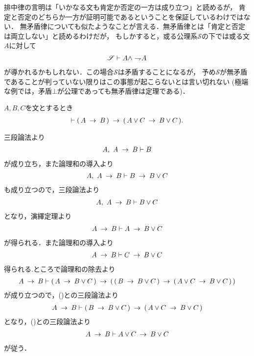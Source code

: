 	排中律の言明は「いかなる文も肯定か否定の一方は成り立つ」と読めるが，
	肯定と否定のどちらか一方が証明可能であるということを保証しているわけではない．
	無矛盾律についても似たようなことが言える．無矛盾律とは「肯定と否定は両立しない」と読めるわけだが，
	もしかすると，或る公理系$\mathscr{S}$の下では或る文$A$に対して
	\begin{align}
		\mathscr{S} \vdash A \wedge \rightharpoondown\hspace{-0.25em} A
	\end{align}
	が導かれるかもしれない．この場合$\mathscr{S}$は矛盾することになるが，
	予め$\mathscr{S}$が無矛盾であることが判っていない限りはこの事態が起こらないとは言い切れない
	(極端な例では，矛盾$\bot$が公理であっても無矛盾律は定理である)．
	
	\begin{screen}
		\begin{logicalthm}[含意の論理和への遺伝性]
		\label{logicalthm:heredity_of_implication_to_disjunction}
			$A,B,C$を文とするとき
			\begin{align}
				\vdash (\, A \hspace{0.25em}\rightarrow\hspace{0.25em} B\, ) \hspace{0.25em}\rightarrow\hspace{0.25em} (\, A \vee C \hspace{0.25em}\rightarrow\hspace{0.25em} B \vee C\, ).
			\end{align}
		\end{logicalthm}
	\end{screen}
	
	\begin{sketch}
		三段論法より
		\begin{align}
			A,\ A \hspace{0.25em}\rightarrow\hspace{0.25em} B \vdash B
		\end{align}
		が成り立ち，また論理和の導入より
		\begin{align}
			A,\ A \hspace{0.25em}\rightarrow\hspace{0.25em} B \vdash B \hspace{0.25em}\rightarrow\hspace{0.25em} B \vee C
		\end{align}
		も成り立つので，三段論法より
		\begin{align}
			A,\ A \hspace{0.25em}\rightarrow\hspace{0.25em} B \vdash B \vee C
		\end{align}
		となり，演繹定理より
		\begin{align}
			A \hspace{0.25em}\rightarrow\hspace{0.25em} B \vdash A \hspace{0.25em}\rightarrow\hspace{0.25em} B \vee C
			\label{fom:heredity_of_implication_to_disjunction_1}
		\end{align}
		が得られる．また論理和の導入より
		\begin{align}
			A \hspace{0.25em}\rightarrow\hspace{0.25em} B \vdash C \hspace{0.25em}\rightarrow\hspace{0.25em} B \vee C
			\label{fom:heredity_of_implication_to_disjunction_2}
		\end{align}
		得られる.ところで論理和の除去より
		\begin{align}
			A \hspace{0.25em}\rightarrow\hspace{0.25em} B \vdash (\, A \hspace{0.25em}\rightarrow\hspace{0.25em} B \vee C\, )
			\hspace{0.25em}\rightarrow\hspace{0.25em} (\, (\, B \hspace{0.25em}\rightarrow\hspace{0.25em} B \vee C\, )
			\hspace{0.25em}\rightarrow\hspace{0.25em} (\, A \vee C \hspace{0.25em}\rightarrow\hspace{0.25em} B \vee C\, )\, )
		\end{align}
		が成り立つので，()との三段論法より
		\begin{align}
			A \hspace{0.25em}\rightarrow\hspace{0.25em} B \vdash (\, B \hspace{0.25em}\rightarrow\hspace{0.25em} B \vee C\, )
			\hspace{0.25em}\rightarrow\hspace{0.25em} (\, A \vee C \hspace{0.25em}\rightarrow\hspace{0.25em} B \vee C\, )
		\end{align}
		となり，()との三段論法より
		\begin{align}
			A \hspace{0.25em}\rightarrow\hspace{0.25em} B \vdash A \vee C \hspace{0.25em}\rightarrow\hspace{0.25em} B \vee C
		\end{align}
		が従う．
		\QED
	\end{sketch}
	
